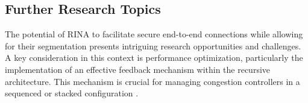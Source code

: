 \documentclass{ieeeaccess}
\begin{document}
%
%
%
%

\subsection{Further Research Topics}
The potential of RINA to facilitate secure end-to-end connections while allowing for their segmentation presents intriguing research opportunities and challenges. A key consideration in this context is performance optimization, particularly the implementation of an effective feedback mechanism within the recursive architecture. This mechanism is crucial for managing congestion controllers in a sequenced or stacked configuration \cite{peymanICC16}.
\end{document}
